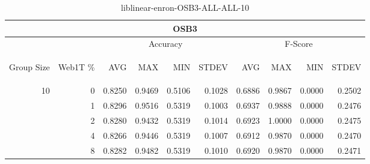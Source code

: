 \begin{center}
\begin{table}[htbp]
\begin{tabular}{ | r | r | r | r | r | r | r | r | r | r |}
\hline
\multicolumn{10}{|c|}{OSB3}\\
\hline
 & & \multicolumn{4}{|c|}{Accuracy} & \multicolumn{4}{|c|}{F-Score}\\ \cline{3-10}
\begin{sideways}Group Size\end{sideways} & \begin{sideways}Web1T \%\end{sideways} & \begin{sideways}AVG\end{sideways} & \begin{sideways}MAX\end{sideways} & \begin{sideways}MIN\end{sideways} & \begin{sideways}STDEV\end{sideways} & \begin{sideways}AVG\end{sideways} & \begin{sideways}MAX\end{sideways} & \begin{sideways}MIN\end{sideways} & \begin{sideways}STDEV\end{sideways}\\
\hline
\multirow{5}{*}{10}
 & 0 & 0.8250 & 0.9469 & 0.5106 & 0.1028 & 0.6886 & 0.9867 & 0.0000 & 0.2502\\ \cline{2-10}
 & 1 & 0.8296 & 0.9516 & 0.5319 & 0.1003 & 0.6937 & 0.9888 & 0.0000 & 0.2476\\ \cline{2-10}
 & 2 & 0.8280 & 0.9432 & 0.5319 & 0.1014 & 0.6923 & 1.0000 & 0.0000 & 0.2475\\ \cline{2-10}
 & 4 & 0.8266 & 0.9446 & 0.5319 & 0.1007 & 0.6912 & 0.9870 & 0.0000 & 0.2470\\ \cline{2-10}
 & 8 & 0.8282 & 0.9482 & 0.5319 & 0.1010 & 0.6920 & 0.9870 & 0.0000 & 0.2471\\ \cline{2-10}
\hline
\end{tabular}
\caption{liblinear-enron-OSB3-ALL-ALL-10}
\end{table}
\end{center}

